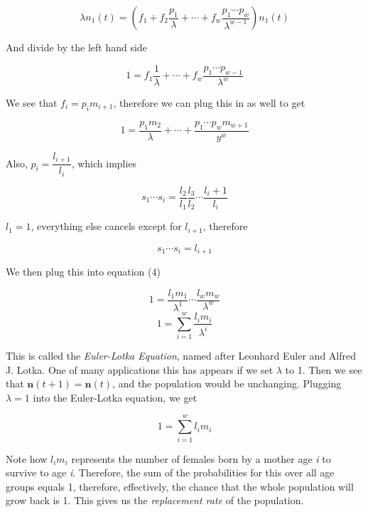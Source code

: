 \documentclass{article}
\begin{document}
\begin{equation*}
\lambda n_1(t) = (f_1 + f_2 \frac{p_1}{\lambda} + \cdots + f_w \frac{p_1 \cdots p_w}{\lambda ^{w-1}}) n_1(t)
\end{equation*}

And divide by the left hand side

\begin{equation*}
1 = f_1 \frac{1}{\lambda} + \cdots + f_w \frac{p_1 \cdots p_{w-1}}{\lambda ^{w
}}
\end{equation*}

We see that $ f_i = p_im_{i+1}$, therefore we can plug this in as well to get

\begin{equation}
1 = \frac{p_1m_2}{\lambda} + \cdots + \frac{p_1 \cdots p_{w}m_{w+1}}{y^w}
\end{equation} 

Also, $ p_i= \dfrac{l_{i+1}}{l_i} $, which implies

\begin{equation*}
s_1 \cdots s_i = \frac{l_2}{l_1} \frac{l_3}{l_2} \cdots \frac{l_i+1}{l_i}
\end{equation*}

$ l_1 = 1$, everything else cancels except for $ l_{i+1} $, therefore

\begin{equation*}
s_1 \cdots s_i = l_{i+1}
\end{equation*}

We then plug this into equation (4)

\begin{equation*}
1 = \frac{l_1m_1}{\lambda ^ 1} \cdots \frac{l_wm_w}{\lambda ^ w}
\end{equation*}
\begin{equation*}
1 = \displaystyle\sum_{i=1}^{w}\frac{l_im_i}{\lambda ^ i}
\end{equation*}

This is called the \textit{Euler-Lotka Equation}, named after Leonhard Euler and Alfred J. Lotka. One of many applications this has appears if we set $ \lambda $ to 1. Then we see that $ \mathbf{n}(t+1) = \mathbf{n}(t) $, and the population would be unchanging. Plugging $ \lambda = 1 $ into the Euler-Lotka equation, we get

\begin{equation*}
1 = \displaystyle\sum_{i=1}^{w} l_im_i
\end{equation*}

Note how $ l_im_i $ represents the number of females born by a mother age \textit{i} to survive to age \textit{i}. Therefore, the sum of the probabilities for this over all age groups equals 1, therefore, effectively, the chance that the whole population will grow back is 1. This gives us the \textit{replacement rate} of the population.
\end{document}
